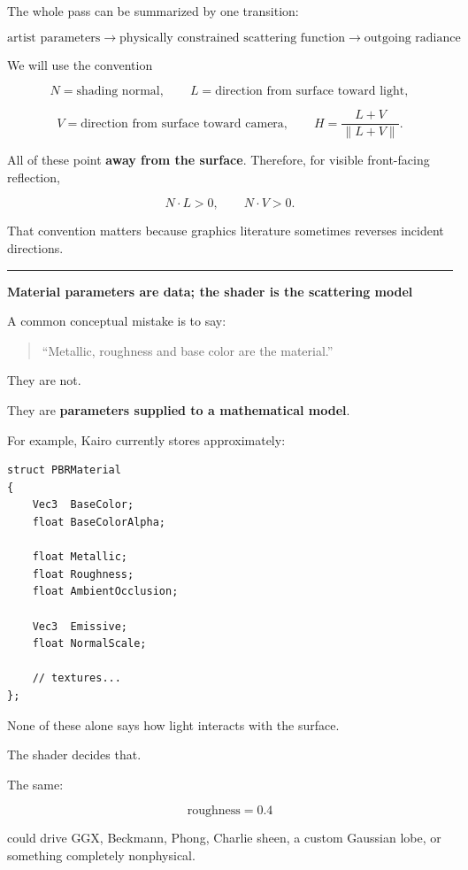 The whole pass can be summarized by one transition:

\[
\boxed{
\text{artist parameters}
\longrightarrow
\text{physically constrained scattering function}
\longrightarrow
\text{outgoing radiance}
}
\]

We will use the convention

\[
N=\text{shading normal},
\qquad
L=\text{direction from surface toward light},
\]

\[
V=\text{direction from surface toward camera},
\qquad
H=\frac{L+V}{\|L+V\|}.
\]

All of these point \textbf{away from the surface}. Therefore, for visible front-facing reflection,

\[
N\cdot L>0,
\qquad
N\cdot V>0.
\]

That convention matters because graphics literature sometimes reverses incident directions.

\begin{center}\rule{0.5\linewidth}{0.5pt}\end{center}

\textbf{Material parameters are data; the shader is the scattering model}

A common conceptual mistake is to say:

\begin{quote}
``Metallic, roughness and base color are the material.''
\end{quote}

They are not.

They are \textbf{parameters supplied to a mathematical model}.

For example, Kairo currently stores approximately:

\begin{verbatim}
struct PBRMaterial
{
    Vec3  BaseColor;
    float BaseColorAlpha;

    float Metallic;
    float Roughness;
    float AmbientOcclusion;

    Vec3  Emissive;
    float NormalScale;

    // textures...
};
\end{verbatim}

None of these alone says how light interacts with the surface.

The shader decides that.

The same:

\[
\text{roughness}=0.4
\]

could drive GGX, Beckmann, Phong, Charlie sheen, a custom Gaussian lobe, or something completely nonphysical.

